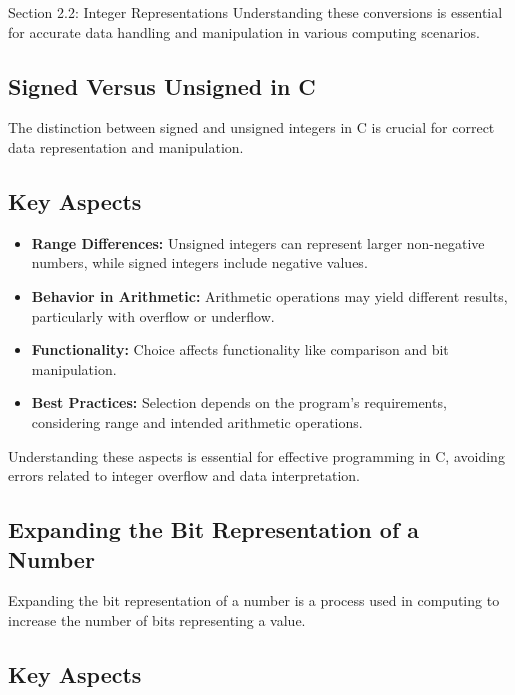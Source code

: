 \begin{notes}{Section 2.2: Integer Representations}
    Understanding these conversions is essential for accurate data handling and manipulation in various computing scenarios.

    \subsection*{Signed Versus Unsigned in C}

    The distinction between signed and unsigned integers in C is crucial for correct data representation and manipulation.
    
    \subsection*{Key Aspects}

    \begin{itemize}
        \item \textbf{Range Differences:} Unsigned integers can represent larger non-negative numbers, while signed integers include negative values.
        \item \textbf{Behavior in Arithmetic:} Arithmetic operations may yield different results, particularly with overflow or underflow.
        \item \textbf{Functionality:} Choice affects functionality like comparison and bit manipulation.
        \item \textbf{Best Practices:} Selection depends on the program's requirements, considering range and intended arithmetic operations.
    \end{itemize}
    
    Understanding these aspects is essential for effective programming in C, avoiding errors related to integer overflow and data interpretation.    

    \subsection*{Expanding the Bit Representation of a Number}

    Expanding the bit representation of a number is a process used in computing to increase the number of bits representing a value.
    
    \subsection*{Key Aspects}


\end{notes}
